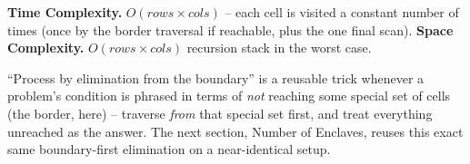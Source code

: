 \begin{complexitybox}
\textbf{Time Complexity.} $O(\textit{rows} \times \textit{cols})$ --
each cell is visited a constant number of times (once by the border
traversal if reachable, plus the one final scan).
\textbf{Space Complexity.} $O(\textit{rows} \times \textit{cols})$
recursion stack in the worst case.
\end{complexitybox}

\begin{takeawaybox}
``Process by elimination from the boundary'' is a reusable trick
whenever a problem's condition is phrased in terms of \emph{not}
reaching some special set of cells (the border, here) -- traverse
\emph{from} that special set first, and treat everything unreached as
the answer. The next section, Number of Enclaves, reuses this exact
same boundary-first elimination on a near-identical setup.
\end{takeawaybox}
